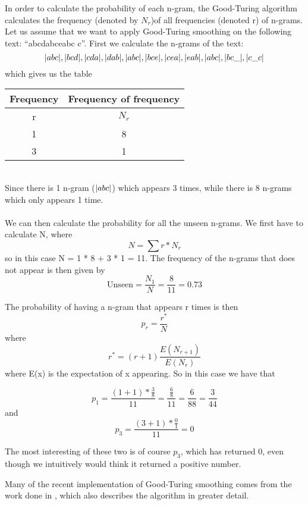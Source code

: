 In order to calculate the probability of each n-gram, the Good-Turing algorithm calculates the frequency (denoted by $N_r$)of all frequencies (denoted r) of n-grams. Let us assume that we want to apply Good-Turing smoothing on the following text: ``abcdabceabc c''. First we calculate the n-grams of the text:\\
$$
|abc|, |bcd|, |cda|, |dab|, |abc|, |bce|, |cea|, |eab|, |abc|, |bc\_|, |c\_c|
$$
which gives us the table\\
\begin{tabular}{|cc|}
\hline
Frequency & Frequency of frequency \\
\hline
r & $N_{r}$ \\
1 & 8\\
3 & 1\\
\hline
\end{tabular}\\
Since there is 1 n-gram ($|abc|$) which appears 3 times, while there is 8 n-grams which only appears 1 time. 
\\\\
We can then calculate the probability for all the unseen n-grams. We first have to calculate N, where 
$$
N = \sum r * N_r
$$
so in this case N = 1 * 8 + 3 * 1 = 11. The frequency of the n-grams that does not appear is then given by 
$$
\mathrm{Unseen} = \frac{N_1}{N} = \frac{8}{11} = 0.73
$$

The probability of having a n-gram that appears r times is then 
$$p_r = \frac{r^*}{N}$$
 where 
$$r^* = (r+1)\frac{E(N_{r+1})}{E(N_r)}$$
 where E(x) is the expectation of x appearing. So in this case we have that 

$$p_1 = \frac{(1 + 1) * \frac{3}{8}}{11} = \frac{\frac{6}{8}}{11} = \frac{6}{88} = \frac{3}{44}$$ and  
$$p_3 = \frac{(3 + 1) * \frac{0}{1}}{11} = 0$$

The most interesting of these two is of course $p_3$, which has returned 0, even though we intuitively would think it returned a positive number.

Many of the recent implementation of Good-Turing smoothing comes from the work done in \cite{Gale94good-turingsmoothing}, which also describes the algorithm in greater detail.
